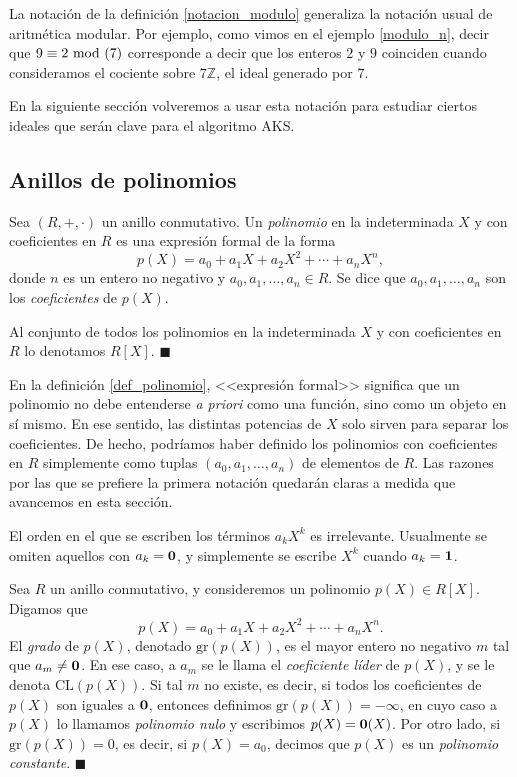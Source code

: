 La notación de la definición \ref{notacion_modulo} generaliza la notación usual de aritmética modular. Por ejemplo, como vimos en el ejemplo \ref{modulo_n}, decir que $9 \equiv 2 \!\! \mod (7)$ corresponde a decir que los enteros $2$ y $9$ coinciden cuando consideramos el cociente sobre $7\mathbb{Z}$, el ideal generado por $7$.

En la siguiente sección volveremos a usar esta notación para estudiar ciertos ideales que serán clave para el algoritmo AKS.

\subsection{Anillos de polinomios}

\begin{definition} \label{def_polinomio}
Sea $(R, +, \cdot)$ un anillo conmutativo. Un \emph{polinomio} en la indeterminada $X$ y con coeficientes en $R$ es una expresión formal de la forma
$$p(X) = a_0 + a_1X + a_2X^2 + \cdots + a_n X^n,$$
donde $n$ es un entero no negativo y $a_0, a_1, \dots, a_n \in R$. Se dice que $a_0, a_1, \dots, a_n$ son los \emph{coeficientes} de $p(X)$.

Al conjunto de todos los polinomios en la indeterminada $X$ y con coeficientes en $R$ lo denotamos $R[X]$. 
\hfill$\blacksquare$
\end{definition}

En la definición \ref{def_polinomio}, <<expresión formal>> significa que un polinomio no debe entenderse \textit{a priori} como una función, sino como un objeto en sí mismo. En ese sentido, las distintas potencias de $X$ solo sirven para separar los coeficientes. De hecho, podríamos haber definido los polinomios con coeficientes en $R$ simplemente como tuplas $(a_0, a_1, \dots, a_n)$ de elementos de $R$. Las razones por las que se prefiere la primera notación quedarán claras a medida que avancemos en esta sección.

El orden en el que se escriben los términos $a_k X^k$ es irrelevante. Usualmente se omiten aquellos con $a_k=\mathbf{0}$, y simplemente se escribe $X^k$ cuando $a_k = \mathbf{1}$.

\begin{definition}
Sea $R$ un anillo conmutativo, y consideremos un polinomio $p(X) \in R[X]$. Digamos que
$$p(X) = a_0 + a_1X + a_2X^2 + \cdots + a_n X^n.$$
El \emph{grado} de $p(X)$, denotado $\mathrm{gr}(p(X))$, es el mayor entero no negativo $m$ tal que $a_m \neq \mathbf{0}$. En ese caso, a $a_m$ se le llama el \emph{coeficiente líder} de $p(X)$, y se le denota $\mathrm{CL}(p(X))$. Si tal $m$ no existe, es decir, si todos los coeficientes de $p(X)$ son iguales a $\mathbf{0}$, entonces definimos $\mathrm{gr}(p(X)) = -\infty$, en cuyo caso a $p(X)$ lo llamamos \emph{polinomio nulo} y escribimos $p(X) = \mathbf{0}(X)$. Por otro lado, si $\mathrm{gr}(p(X)) = 0$, es decir, si $p(X) = a_0$, decimos que $p(X)$ es un \emph{polinomio constante}.
\hfill$\blacksquare$
\end{definition}

